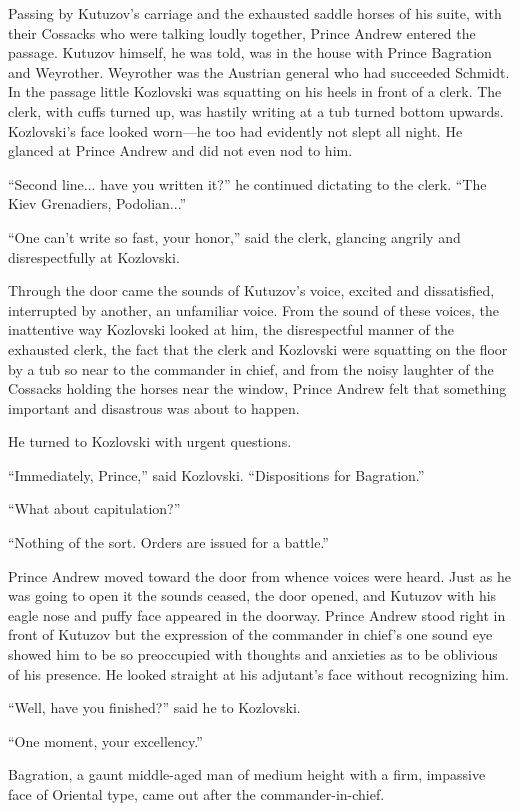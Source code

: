 Passing by Kutuzov's carriage and the exhausted saddle horses of
his suite, with their Cossacks who were talking loudly together,
Prince Andrew entered the passage. Kutuzov himself, he was told,
was in the house with Prince Bagration and Weyrother. Weyrother
was the Austrian general who had succeeded Schmidt. In the
passage little Kozlovski was squatting on his heels in front of a
clerk. The clerk, with cuffs turned up, was hastily writing at a
tub turned bottom upwards. Kozlovski's face looked worn---he too
had evidently not slept all night. He glanced at Prince Andrew
and did not even nod to him.

``Second line... have you written it?'' he continued dictating to
the clerk. ``The Kiev Grenadiers, Podolian...''

``One can't write so fast, your honor,'' said the clerk, glancing
angrily and disrespectfully at Kozlovski.

Through the door came the sounds of Kutuzov's voice, excited and
dissatisfied, interrupted by another, an unfamiliar voice. From
the sound of these voices, the inattentive way Kozlovski looked
at him, the disrespectful manner of the exhausted clerk, the fact
that the clerk and Kozlovski were squatting on the floor by a tub
so near to the commander in chief, and from the noisy laughter of
the Cossacks holding the horses near the window, Prince Andrew
felt that something important and disastrous was about to happen.

He turned to Kozlovski with urgent questions.

``Immediately, Prince,'' said Kozlovski. ``Dispositions for
Bagration.''

``What about capitulation?''

``Nothing of the sort. Orders are issued for a battle.''

Prince Andrew moved toward the door from whence voices were
heard. Just as he was going to open it the sounds ceased, the
door opened, and Kutuzov with his eagle nose and puffy face
appeared in the doorway.  Prince Andrew stood right in front of
Kutuzov but the expression of the commander in chief's one sound
eye showed him to be so preoccupied with thoughts and anxieties
as to be oblivious of his presence. He looked straight at his
adjutant's face without recognizing him.

``Well, have you finished?'' said he to Kozlovski.

``One moment, your excellency.''

Bagration, a gaunt middle-aged man of medium height with a firm,
impassive face of Oriental type, came out after the
commander-in-chief.

